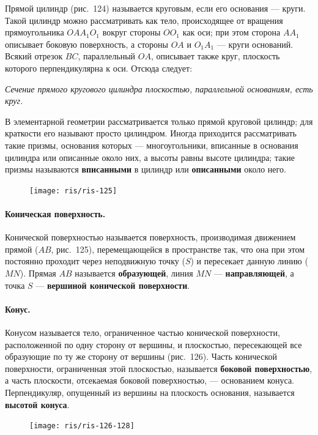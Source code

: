\documentclass[twoside]{book}
\begin{document}
Прямой цилиндр (рис.~124) называется круговым, если его основания --- круги.
Такой цилиндр можно рассматривать как тело, происходящее от вращения прямоугольника $OAA_1O_1$ вокруг стороны $OO_1$ как оси;
при этом сторона $AA_1$ описывает боковую поверхность, а стороны $OA$ и $O_1A_1$ --- круги оснований.
Всякий отрезок $BC$, параллельный $OA$, описывает также круг, плоскость которого перпендикулярна к оси.
Отсюда следует:

\emph{Сечение прямого кругового цилиндра плоскостью, параллельной основаниям, есть круг.}

В элементарной геометрии рассматривается только прямой круговой цилиндр;
для краткости его называют просто цилиндром.
Иногда приходится рассматривать такие призмы, основания которых --- многоугольники, вписанные в основания цилиндра или описанные около них, а высоты равны высоте цилиндра;
такие призмы называются \textbf{вписанными} в цилиндр или \textbf{описанными} около него. %

\begin{figure}[h!]
\centering
\texttt{[image: ris/ris-125]}
\caption{}
\end{figure}

\paragraph{Коническая поверхность.}\label{1938/s108}
Конической поверхностью называется поверхность, производимая движением прямой ($AB$, рис.~125), перемещающейся в пространстве так, что она при этом постоянно проходит через неподвижную точку ($S$) и пересекает данную линию ($MN$).
Прямая $AB$ называется \textbf{образующей}, линия $MN$ --- \textbf{направляющей}, а точка $S$ --- \textbf{вершиной конической поверхности}.

\paragraph{Конус.}\label{1938/s109}
Конусом называется тело, ограниченное частью конической поверхности, расположенной по одну сторону от вершины, и плоскостью, пересекающей все образующие по ту же сторону от вершины (рис.~126).
Часть конической поверхности, ограниченная этой плоскостью, называется \textbf{боковой поверхностью}, а часть плоскости, отсекаемая боковой поверхностью, --- основанием конуса.
Перпендикуляр, опущенный из вершины на плоскость основания, называется \textbf{высотой конуса}.

\begin{figure}[h!]
\centering
\texttt{[image: ris/ris-126-128]}
\caption{}
\end{figure}
\end{document}
